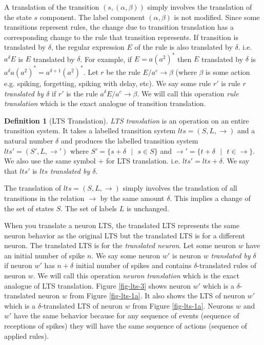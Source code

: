 \documentclass[runningheads,a4paper]{llncs}
\theoremstyle{definition}
\newtheorem{definition2}{Definition}
\newcommand{\ra}{\rightarrow}
\newcommand{\se}{\text{ }}
\begin{document}
A translation of the transition $(s,(\alpha,\beta))$ simply involves the translation of the state
$s$ component. The label component $(\alpha,\beta)$ is not modified. Since some transitions 
represent rules, the change due to transition translation has a corresponding change to the rule
that transition represents. If transition is translated by $\delta$, the regular expression $E$
of the rule is also translated by $\delta$. i.e. $a^{\delta}E$ is $E$ translated by $\delta$. For
example, if $E=a(a^2)^*$ then $E$ translated by $\delta$ is $a^{\delta}a(a^2)^*=a^{\delta+1}
(a^2)^*$. Let $r$ be the rule $E/a^c \ra \beta$ (where $\beta$ is some action e.g. spiking,
forgetting, spiking with delay, etc). We say some rule $r'$ is rule $r$ \emph{translated by 
$\delta$} if $r'$ is the rule $a^{\delta} E/a^c \ra \beta$. We will call this operation 
\emph{rule translation} which is the exact analogue of transition translation.

\begin{definition2}[LTS Translation]
\emph{LTS translation} is an operation on an entire transition system. It takes a labelled 
transition system $lts=(S,L,\ra)$ and a natural number $\delta$ and produces the labelled transition 
system $lts'=(S',L,\ra')$ where $S'=\{s+\delta\se|\se s \in S\}$ and $\ra' = \{t+\delta\se|\se t \in 
\ra\}$. We also use the same symbol $+$ for LTS translation. i.e. $lts'=lts+\delta$. We say that 
$lts'$ is \emph{$lts$ translated by $\delta$}.
\end{definition2}

The translation of $lts=(S,L,\ra)$ simply involves the translation of all transitions in the 
relation $\ra$ by the same amount $\delta$. This implies a change of the set of states $S$. The set 
of labels $L$ is unchanged.  

When you translate a neuron LTS, the translated LTS represents the same neuron behavior as the 
original LTS but the translated LTS is for a different neuron. The translated LTS is for the 
\emph{translated neuron}. Let some neuron $w$ have an initial number of spike $n$. We say some 
neuron $w'$ is neuron $w$ \emph{translated by} $\delta$ if neuron $w'$ has $n+\delta$ initial number 
of spikes and contains $\delta$-translated rules of neuron $w$. We will call this operation 
\emph{neuron translation} which is the exact analogue of LTS translation. Figure \ref{fig-lts-3} 
shows neuron $w'$ which is a $\delta$-translated neuron $w$ from Figure \ref{fig-lts-1a}. It also
shows the LTS of neuron $w'$ which is a $\delta$-translated LTS of neuron $w$ from Figure
\ref{fig-lts-1a}. Neurons $w$ and $w'$ have the same behavior because for any sequence of events
(sequence of receptions of spikes) they will have the same sequence of actions (sequence of applied 
rules).
\end{document}
